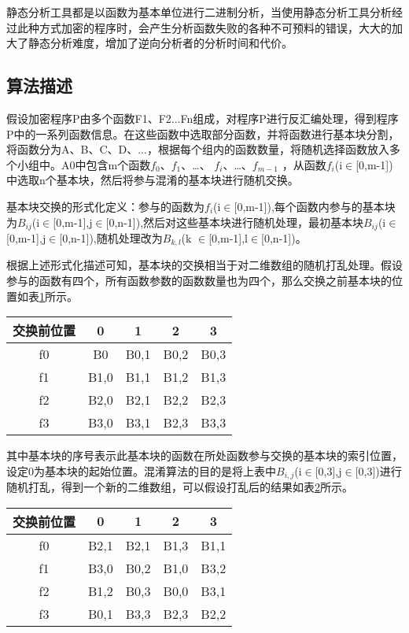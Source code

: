 静态分析工具都是以函数为基本单位进行二进制分析，当使用静态分析工具分析经过此种方式加密的程序时，会产生分析函数失败的各种不可预料的错误，大大的加大了静态分析难度，增加了逆向分析者的分析时间和代价。

\subsection{算法描述}

假设加密程序P由多个函数F1、F2...Fn组成，对程序P进行反汇编处理，得到程序P中的一系列函数信息。在这些函数中选取部分函数，并将函数进行基本块分割，将函数分为A、B、C、D、...，根据每个组内的函数数量，将随机选择函数放入多个小组中。A0中包含m个函数$f_{0} $、$ f_{1} $、…、 $ f_{i} $、…、$ f_{m-1} $ ，从函数$ f_{i} $(i$\in$[0,m-1])中选取n个基本块，然后将参与混淆的基本块进行随机交换。

基本块交换的形式化定义：参与的函数为$ f_{i} $(i$\in$[0,m-1]),每个函数内参与的基本块为$ B_{ij} $(i$\in$[0,m-1],j$\in$[0,n-1]),然后对这些基本块进行随机处理，最初基本块$ B_{ij} $(i$\in$[0,m-1],j$\in$[0,n-1]),随机处理改为$ B_{k,l} $(k
$\in$[0,m-1],l$\in$[0,n-1])。

根据上述形式化描述可知，基本块的交换相当于对二维数组的随机打乱处理。假设参与的函数有四个，所有函数参数的函数数量也为四个，那么交换之前基本块的位置如表\ref{qian}所示。

\begin{table}[htbp]
	\centering
	\begin{tabular}{ccccc}
		\hline
		交换前位置 & 0    & 1    & 2    & 3    \\ \hline
		f0    & B0   & B0,1 & B0,2 & B0,3 \\
		f1    & B1,0 & B1,1 & B1,2 & B1,3 \\
		f2    & B2,0 & B2,1 & B2,2 & B2,3 \\
		f3    & B3,0 & B3,1 & B2,3 & B3,3 \\ \hline
	\end{tabular}
	\label{qian}
\end{table}

其中基本块的序号表示此基本块的函数在所处函数参与交换的基本块的索引位置，设定0为基本块的起始位置。混淆算法的目的是将上表中$B_{i,j}$(i$\in$[0,3],j$\in$[0,3])进行随机打乱，得到一个新的二维数组，可以假设打乱后的结果如表\ref{hou}所示。

\begin{table}[htbp]
	\centering
	\begin{tabular}{ccccc}
		\hline
		交换前位置 & 0    & 1    & 2    & 3    \\ \hline
		f0    & B2,1 & B2,1 & B1,3 & B1,1 \\
		f1    & B3,0 & B0,2 & B1,0 & B3,2 \\
		f2    & B1,2 & B0,3 & B0,0 & B3,1 \\
		f3    & B0,1 & B3,3 & B2,3 & B2,2 \\ \hline
	\end{tabular}

	\label{hou}
\end{table}

